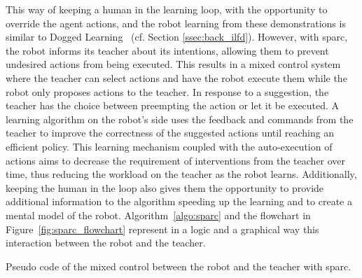 This way of keeping a human in the learning loop, with the opportunity to override the agent actions, and the robot learning from these demonstrations is similar to Dogged Learning~\citep{grollman2007dogged} (cf. Section \ref{ssec:back_ilfd}). However, with \gls{sparc}, the robot informs its teacher about its intentions, allowing them to prevent undesired actions from being executed. This results in a mixed control system where the teacher can select actions and have the robot execute them while the robot only proposes actions to the teacher. In response to a suggestion, the teacher has the choice between preempting the action or let it be executed. A learning algorithm on the robot's side uses the feedback and commands from the teacher to improve the correctness of the suggested actions until reaching an efficient policy. This learning mechanism coupled with the auto-execution of actions aims to decrease the requirement of interventions from the teacher over time, thus reducing the workload on the teacher as the robot learns. Additionally, keeping the human in the loop also gives them the opportunity to provide additional information to the algorithm speeding up the learning and to create a mental model of the robot. Algorithm~\ref{algo:sparc} and the flowchart in Figure~\ref{fig:sparc_flowchart} represent in a logic and a graphical way this interaction between the robot and the teacher.

\begin{algorithm}
	\DontPrintSemicolon
	{
	}	

	\caption{Pseudo code of the mixed control between the robot and the teacher with \gls{sparc}.}
	\label{algo:sparc}
\end{algorithm}

